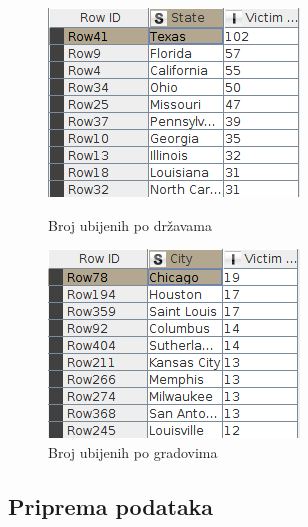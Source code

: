 \documentclass[12pt, a4paper]{article}
\begin{document}
\begin{figure}[H]
\centering
  \begin{minipage}[b]{0.3\textwidth}
    \includegraphics[width=\textwidth]{geoConfirm_state_childrenKI.png}
    \caption{Broj ubijenih po dr\v zavama}
  \end{minipage}
  \hfill
  \begin{minipage}[b]{0.3\textwidth}
    \includegraphics[width=\textwidth]{geoConfirm_city_childrenKI.png}
    \caption{Broj ubijenih po gradovima}
  \end{minipage}
\end{figure}



\subsection {Priprema podataka}
\end{document}
